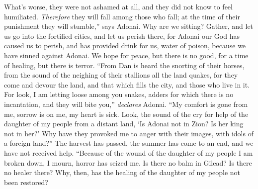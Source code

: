 \begin{biblechapter}
What’s worse, they were not ashamed at all, 
and they did not know to feel humiliated. 
\textit{Therefore} they will fall among those who fall; 
at the time of their punishment they will stumble,” says Adonai.
 Why are we sitting? 
Gather, and let us go into the fortified cities, 
and let us perish there, 
for Adonai our God has caused us to perish, 
and has provided drink for us, water of poison, 
because we have sinned against Adonai.
\verse We hope for peace, 
but there is no good, 
for a time of healing, 
but there is terror.
\verse “From Dan is heard the snorting of their horses, 
from the sound of the neighing of their stallions all the land quakes, 
for they come and devour the land, 
and that which fills the city, 
and those who live in it.
\verse For look, I am letting loose among you snakes, 
adders for which there is no incantation, 
and they will bite you,” \textit{declares} Adonai.
\verse “My comfort is gone from me, 
sorrow is on me, 
my heart is sick.
\verse Look, the sound of the cry for help of the daughter of my people 
from a distant land, 
‘Is Adonai not in Zion? 
Is her king not in her?’ 
Why have they provoked me to anger with their images, 
with idols of a foreign land?”
\verse The harvest has passed, 
the summer has come to an end, 
and we have not received help.
 “Because of the wound of the daughter of my people I am broken down, 
I mourn, horror has seized me.
\verse Is there no balm in Gilead? 
Is there no healer there? 
Why, then, has the healing of the daughter of my people not been restored?
\end{biblechapter}

